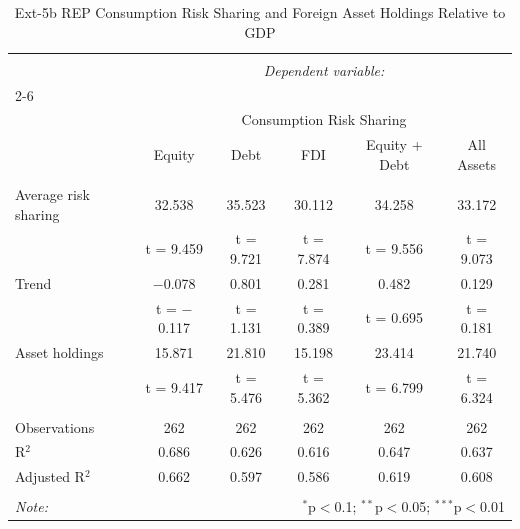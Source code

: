 
\begin{table}[!htbp] \centering 
  \caption{Ext-5b REP Consumption Risk Sharing and Foreign Asset Holdings Relative to GDP} 
  \label{} 
\begin{tabular}{@{\extracolsep{5pt}}lccccc} 
\\[-1.8ex]\hline 
\hline \\[-1.8ex] 
 & \multicolumn{5}{c}{\textit{Dependent variable:}} \\ 
\cline{2-6} 
\\[-1.8ex] & \multicolumn{5}{c}{Consumption Risk Sharing} \\ 
 & Equity & Debt & FDI & Equity + Debt & All Assets \\ 
\hline \\[-1.8ex] 
 Average risk sharing & 32.538 & 35.523 & 30.112 & 34.258 & 33.172 \\ 
  & t = 9.459 & t = 9.721 & t = 7.874 & t = 9.556 & t = 9.073 \\ 
  Trend & $-$0.078 & 0.801 & 0.281 & 0.482 & 0.129 \\ 
  & t = $-$0.117 & t = 1.131 & t = 0.389 & t = 0.695 & t = 0.181 \\ 
  Asset holdings & 15.871 & 21.810 & 15.198 & 23.414 & 21.740 \\ 
  & t = 9.417 & t = 5.476 & t = 5.362 & t = 6.799 & t = 6.324 \\ 
 \hline \\[-1.8ex] 
Observations & 262 & 262 & 262 & 262 & 262 \\ 
R$^{2}$ & 0.686 & 0.626 & 0.616 & 0.647 & 0.637 \\ 
Adjusted R$^{2}$ & 0.662 & 0.597 & 0.586 & 0.619 & 0.608 \\ 
\hline 
\hline \\[-1.8ex] 
\textit{Note:}  & \multicolumn{5}{r}{$^{*}$p$<$0.1; $^{**}$p$<$0.05; $^{***}$p$<$0.01} \\ 
\end{tabular} 
\end{table} 
